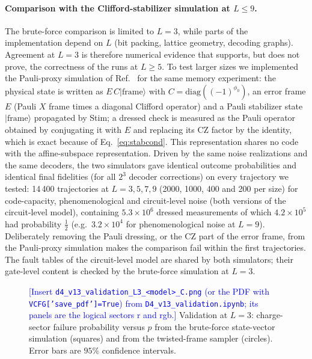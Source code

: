 \documentclass[a4paper]{article}
\newcommand{\blue}[1]{\textcolor{blue}{#1}}
\providecommand{\ket}[1]{\ensuremath{|#1\rangle}}
\begin{document}
\paragraph{Comparison with the Clifford-stabilizer simulation at $L\le9$.}
The brute-force comparison is limited to $L=3$, while parts of the implementation depend on $L$ (bit packing, lattice geometry, decoding graphs). Agreement at $L=3$ is therefore numerical evidence that supports, but does not prove, the correctness of the runs at $L\ge5$. To test larger sizes we implemented the Pauli-proxy simulation of Ref.~\cite{takada2026exact} for the same memory experiment: the physical state is written as $E\,C\ket{\mathrm{frame}}$ with $C=\mathrm{diag}((-1)^{\phi_0})$, an error frame $E$ (Pauli $X$ frame times a diagonal Clifford operator) and a Pauli stabilizer state $\ket{\mathrm{frame}}$ propagated by Stim; a dressed check is measured as the Pauli operator obtained by conjugating it with $E$ and replacing its CZ factor by the identity, which is exact because of Eq.~\eqref{eq:stabcond}. This representation shares no code with the affine-subspace representation. Driven by the same noise realizations and the same decoders, the two simulators gave identical outcome probabilities and identical final fidelities (for all $2^3$ decoder corrections) on every trajectory we tested: 14\,400 trajectories at $L=3,5,7,9$ (2000, 1000, 400 and 200 per size) for code-capacity, phenomenological and circuit-level noise (both versions of the circuit-level model), containing $5.3\times10^6$ dressed measurements of which $4.2\times10^5$ had probability $\tfrac12$ (e.g.\ $3.2\times10^4$ for phenomenological noise at $L=9$). Deliberately removing the Pauli dressing, or the CZ part of the error frame, from the Pauli-proxy simulation makes the comparison fail within the first trajectories. The fault tables of the circuit-level model are shared by both simulators; their gate-level content is checked by the brute-force simulation at $L=3$.

\begin{figure}[t]
  \centering
  \fbox{\rule{0pt}{50mm}\rule{0.82\linewidth}{0pt}}
  \caption{\blue{[Insert \texttt{d4\_v13\_validation\_L3\_<model>\_C.png} (or the PDF with \texttt{VCFG['save\_pdf']=True}) from \texttt{D4\_v13\_validation.ipynb}; its panels are the logical sectors r and rgb.]} Validation at $L=3$: charge-sector failure probability versus $p$ from the brute-force state-vector simulation (squares) and from the twisted-frame sampler (circles). Error bars are $95\%$ confidence intervals.}
  \label{fig:validation}
\end{figure}
\end{document}
